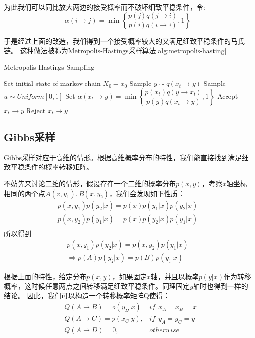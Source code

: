 为此我们可以同比放大两边的接受概率而不破坏细致平稳条件，令:
\begin{equation}
\alpha(i \rightarrow j) = \min\left\{ \dfrac{p(j)q(j \rightarrow i)}{p(i)q(i \rightarrow j)},1 \right\}
\end{equation}

于是经过上面的改造，我们得到一个接受概率较大的又满足细致平稳条件的马氏链。
这种做法被称为Metropolis-Hastings采样算法\ref{alg:metropolis-hasting}
\begin{algorithm}[htb]  
\caption{Metropolis-Hastings Sampling} 
\label{alg:metropolis-hasting} 
\begin{algorithmic}[1] 
\State Set initial state of markov chain $X_0 = x_0$
\State Sample $y \sim q(x_t \rightarrow y)$
\State Sample $u \sim Uniform[0,1]$
\State Set $\alpha( x_t \rightarrow y) = \min \left\{ \dfrac{p(x_t)q(y \rightarrow x_t)}{p(y)q(x_t \rightarrow y)}, 1\right\}$
\State Accept $x_t \rightarrow y$
\Else
\State Reject $x_t \rightarrow y$
\EndIf
\EndFor
\end{algorithmic}  
\end{algorithm}  

\subsection{Gibbs采样}
Gibbs采样对应于高维的情形。根据高维概率分布的特性，我们能直接找到满足细致平稳条件的概率转移矩阵。

不妨先来讨论二维的情形，假设存在一个二维的概率分布$p(x, y)$，考察$x$轴坐标相同的两个点$A(x, y_1), B(x, y_2)$，我们会发现如下性质：
\begin{align*}
p(x, y_1) p(y_2 | x) = p(x) p(y_1| x) p(y_2 |x )\\
p(x, y_2) p(y_1 | x) = p(x) p(y_2| x) p(y_1 |x )\\
\end{align*}
所以得到
\begin{align*}
p(x, y_1) p(y_2 | x) = p(x, y_2) p(y_1 | x) \\
\Rightarrow p(A) p(y_2|x) = p(B) p(y_1 | x)
\end{align*}

根据上面的特性，给定分布$p(x,y)$，如果固定$x$轴，并且以概率$p(y | x)$作为转移概率，这时候任意两点之间转移满足细致平稳条件。同理固定$y$轴时也得到一样的结论。
因此，我们可以构造一个转移概率矩阵Q使得：
\begin{align*}
& Q(A \rightarrow B) = p(y_B | x), & if~~x_A = x_B = x \\
& Q(A \rightarrow C) = p(x_C | y), & if~~y_A = y_C = y \\
& Q(A \rightarrow D) = 0, & otherwise
\end{align*}

